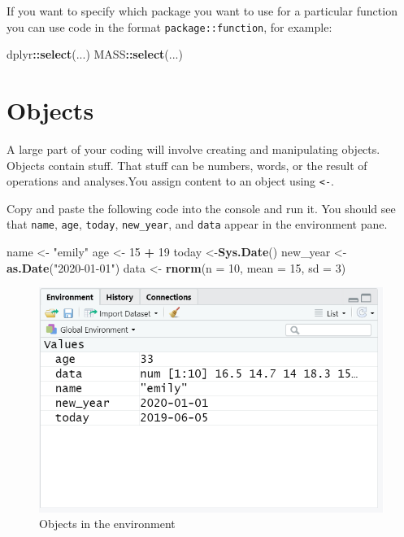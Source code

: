 \documentclass[]{book}
\newenvironment{Shaded}{\begin{snugshade}}{\end{snugshade}}
\newcommand{\DataTypeTok}[1]{\textcolor[rgb]{0.13,0.29,0.53}{#1}}
\newcommand{\DecValTok}[1]{\textcolor[rgb]{0.00,0.00,0.81}{#1}}
\newcommand{\KeywordTok}[1]{\textcolor[rgb]{0.13,0.29,0.53}{\textbf{#1}}}
\newcommand{\NormalTok}[1]{#1}
\newcommand{\OperatorTok}[1]{\textcolor[rgb]{0.81,0.36,0.00}{\textbf{#1}}}
\newcommand{\StringTok}[1]{\textcolor[rgb]{0.31,0.60,0.02}{#1}}
\begin{document}
If you want to specify which package you want to use for a particular function you can use code in the format \texttt{package::function}, for example:

\begin{Shaded}
\begin{Highlighting}[]
\NormalTok{dplyr}\OperatorTok{::}\KeywordTok{select}\NormalTok{(...)}
\NormalTok{MASS}\OperatorTok{::}\KeywordTok{select}\NormalTok{(...)}
\end{Highlighting}
\end{Shaded}

\hypertarget{objects}{%
\section{Objects}\label{objects}}

A large part of your coding will involve creating and manipulating objects. Objects contain stuff. That stuff can be numbers, words, or the result of operations and analyses.You assign content to an object using \texttt{\textless{}-}.

Copy and paste the following code into the console and run it. You should see that \texttt{name}, \texttt{age}, \texttt{today}, \texttt{new\_year}, and \texttt{data} appear in the environment pane.

\begin{Shaded}
\begin{Highlighting}[]
\NormalTok{name <-}\StringTok{ "emily"}
\NormalTok{age <-}\StringTok{ }\DecValTok{15} \OperatorTok{+}\StringTok{ }\DecValTok{19} 
\NormalTok{today <-}\KeywordTok{Sys.Date}\NormalTok{()}
\NormalTok{new_year <-}\StringTok{ }\KeywordTok{as.Date}\NormalTok{(}\StringTok{"2020-01-01"}\NormalTok{)}
\NormalTok{data <-}\StringTok{ }\KeywordTok{rnorm}\NormalTok{(}\DataTypeTok{n =} \DecValTok{10}\NormalTok{, }\DataTypeTok{mean =} \DecValTok{15}\NormalTok{, }\DataTypeTok{sd =} \DecValTok{3}\NormalTok{)}
\end{Highlighting}
\end{Shaded}

\begin{figure}

{\centering \includegraphics[width=1\linewidth]{images/objects-enviro} 

}

\caption{Objects in the environment}\label{fig:img-objects-enviro}
\end{figure}
\end{document}
